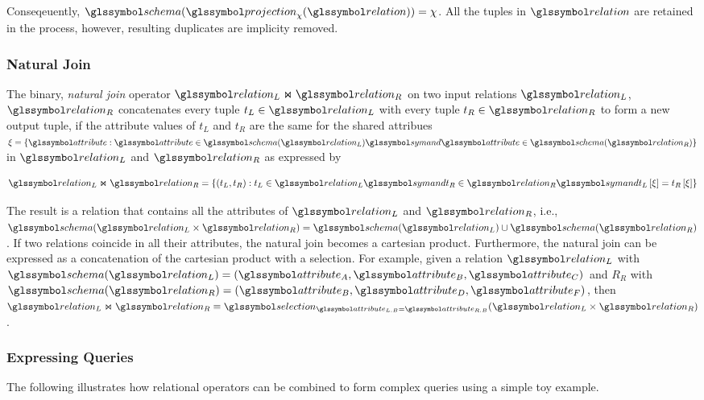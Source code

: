 Conseqeuently, $\schema(\projection_{\chi}(\relation)) = \chi$. All the tuples in $\relation$ are retained in the process, however, resulting duplicates are implicity removed.

\subsubsection{Natural Join}

The binary, \emph{natural join} operator $\relation_L \Join \relation_R$ on two input relations $\relation_L$, $\relation_R$ concatenates every tuple $t_{L} \in \relation_L$ with every tuple $t_{R} \in \relation_R$ to form a new output tuple, if the attribute values of $t_{L}$ and $t_{R}$ are the same for the shared attribues $\xi = \{ \attribute : \attribute \in \schema(\relation_L) \symand \attribute \in \schema(\relation_R) \}$ in $\relation_L$ and $\relation_R$ as expressed by 

\begin{equation}
    \label{equation:rel_op_join}
    \relation_L \Join \relation_R = \{ (t_L, t_R) : t_L \in \relation_L \symand t_R \in \relation_R \symand t_L\left[ \xi \right] = t_R\left[ \xi \right] \}
\end{equation}

The result is a relation that contains all the attributes of $\relation_L$ and $\relation_R$, i.e., $\schema(\relation_L \times \relation_R) = \schema(\relation_L) \cup \schema(\relation_R)$. If two relations coincide in all their attributes, the natural join becomes a cartesian product. Furthermore, the natural join can be expressed as a concatenation of the cartesian product with a selection. For example, given a relation $\relation_L$ with $\schema(\relation_L) = (\attribute_A, \attribute_B, \attribute_C)$ and $R_R$ with $\schema(\relation_R) = (\attribute_B, \attribute_D, \attribute_F)$, then $\relation_L \Join \relation_R \equiv \selection_{\attribute_{L.B} = \attribute_{R.B}}(\relation_L \times \relation_R)$.

\subsubsection{Expressing Queries}

The following  illustrates how relational operators can be combined to form complex queries using a simple toy example.

